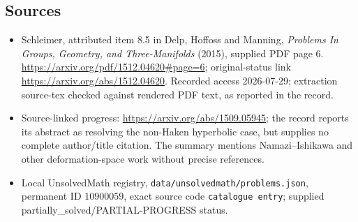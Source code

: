\documentclass[11pt]{article}
\begin{document}
\subsection{Sources}
\begin{itemize}
\item Schleimer, attributed item 8.5 in Delp, Hoffoss and Manning, \emph{Problems In Groups, Geometry, and Three-Manifolds} (2015), supplied PDF page 6. \url{https://arxiv.org/pdf/1512.04620#page=6}; original-status link \url{https://arxiv.org/abs/1512.04620}. Recorded access 2026-07-29; extraction source-tex checked against rendered PDF text, as reported in the record.
\item Source-linked progress: \url{https://arxiv.org/abs/1509.05945}; the record reports its abstract as resolving the non-Haken hyperbolic case, but supplies no complete author/title citation. The summary mentions Namazi--Ishikawa and other deformation-space work without precise references.
\item Local UnsolvedMath registry, \texttt{data/unsolvedmath/problems.json}, permanent ID \(10900059\), exact source code \texttt{catalogue entry}; supplied partially\_solved/PARTIAL-PROGRESS status.
\end{itemize}
\end{document}
